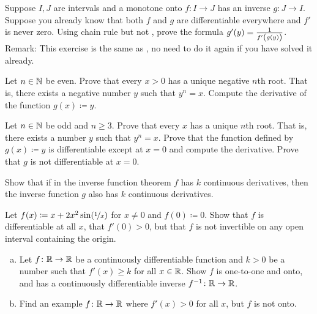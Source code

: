 \begin{exercise}
\pagebreak[2]
Suppose $I,J$ are intervals and a monotone onto $f \colon I \to J$ has an inverse $g \colon J \to I$.
Suppose you already know that both $f$ and $g$ are differentiable
everywhere and $f'$ is never zero.  Using chain rule but not
, prove the
formula $g'(y) = \frac{1}{f'\left(\vphantom{1_1^1}g(y)\right)}$. %
Remark: This exercise is the same as ,
no need to do it again if you have
solved it already.
\end{exercise}

\begin{exercise}
\pagebreak[2]
Let $n\in {\mathbb{N}}$ be even.
Prove that every $x > 0$ has a unique negative $n$th root.
That is, there exists a negative number $y$ such that $y^n = x$.
Compute the derivative
of the function $g(x) \coloneqq y$.
\end{exercise}

\begin{exercise} \label{exercise:oddroot}
Let $n \in {\mathbb{N}}$ be odd and $n \geq 3$.
Prove that every $x$ has a unique $n$th root.
That is, there exists a number $y$ such that $y^n = x$.  Prove that
the function defined by $g(x) \coloneqq y$ is differentiable except at $x=0$
and compute the derivative.  Prove that $g$ is not differentiable at $x=0$.
\end{exercise}

\begin{exercise}
Show that if in the inverse function theorem $f$ has $k$ continuous
derivatives, then the inverse function $g$ also has $k$ continuous
derivatives.
\end{exercise}

\begin{exercise}
Let $f(x) \coloneqq x + 2 x^2 \sin(\nicefrac{1}{x})$ for $x \not= 0$ and
$f(0) \coloneqq 0$.  Show that $f$ is differentiable at all $x$, that $f'(0) > 0$,
but that $f$ is not invertible
on any open interval containing the origin.
\end{exercise}

\begin{exercise}
\leavevmode
\begin{enumerate}[a)]
\item
Let $f \colon {\mathbb{R}} \to {\mathbb{R}}$ be a continuously differentiable function
and $k > 0$ be a number such that $f'(x) \geq k$ for all $x \in {\mathbb{R}}$.
Show $f$ is one-to-one and onto, and has a continuously differentiable
inverse $f^{-1} \colon {\mathbb{R}} \to {\mathbb{R}}$.
\item
Find an example $f \colon {\mathbb{R}} \to {\mathbb{R}}$
where $f'(x) > 0$
for all $x$, but $f$ is not onto.
\end{enumerate}
\end{exercise}

